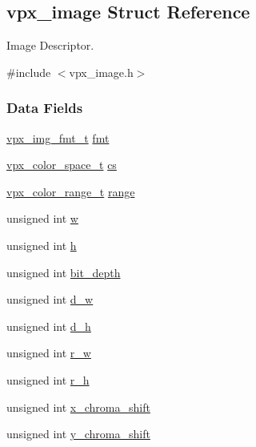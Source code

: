 \hypertarget{structvpx__image}{}\subsection{vpx\+\_\+image Struct Reference}
\label{structvpx__image}


Image Descriptor.  




{\ttfamily \#include $<$vpx\+\_\+image.\+h$>$}

\subsubsection*{Data Fields}
\begin{DoxyCompactItemize}
\item 
\hyperlink{vpx__image_8h_ae694ce1faf676cdb73a8fd6702a67d9c}{vpx\+\_\+img\+\_\+fmt\+\_\+t} \hyperlink{structvpx__image_a1d734f8afa9200a21c2d9f6bcf8c04d8}{fmt}
\item 
\hyperlink{vpx__image_8h_a090b89b8b0cce8d8a4b08a09d81bb772}{vpx\+\_\+color\+\_\+space\+\_\+t} \hyperlink{structvpx__image_a8fda4fb8430e4cede2a4ee7d28dd0a6c}{cs}
\item 
\hyperlink{vpx__image_8h_a644bb65a7cc854238c73ee1e55c5c0ac}{vpx\+\_\+color\+\_\+range\+\_\+t} \hyperlink{structvpx__image_af451ddd9be4cf49958e253a2b8dd12a9}{range}
\item 
unsigned int \hyperlink{structvpx__image_ac7b7d569142f878155b28141653adcd6}{w}
\item 
unsigned int \hyperlink{structvpx__image_a9d1070804dfe08cd5becd68d597fee69}{h}
\item 
unsigned int \hyperlink{structvpx__image_aac11754e8f8e4fb9e7b3a721ce8be0f1}{bit\+\_\+depth}
\item 
unsigned int \hyperlink{structvpx__image_a806bf23143bf00a0b3fdbd6ba030c483}{d\+\_\+w}
\item 
unsigned int \hyperlink{structvpx__image_a31bc5f045d4f3c2b6bb0f57bb53078e7}{d\+\_\+h}
\item 
unsigned int \hyperlink{structvpx__image_a1fe4736c2554836d510589cdbbece76a}{r\+\_\+w}
\item 
unsigned int \hyperlink{structvpx__image_ad969a04e4a11749f3718ef5909db6da8}{r\+\_\+h}
\item 
unsigned int \hyperlink{structvpx__image_affaf210489dcefebd90b87fd5f12dc0b}{x\+\_\+chroma\+\_\+shift}
\item 
unsigned int \hyperlink{structvpx__image_a1e3d9b699d46ca32e3916d1ac635a4a2}{y\+\_\+chroma\+\_\+shift}

\end{DoxyCompactItemize}
